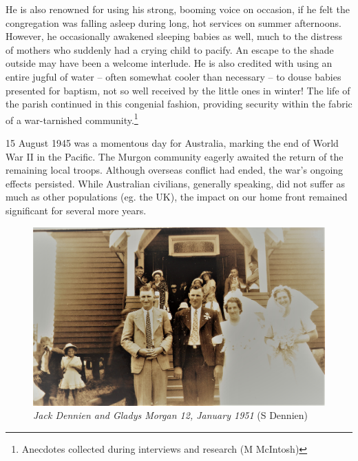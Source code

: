 He is also renowned for using his strong, booming voice on occasion, if he felt the congregation was falling asleep during long, hot services on summer afternoons. However, he occasionally awakened sleeping babies as well, much to the distress of mothers who suddenly had a crying child to pacify. An escape to the shade outside may have been a welcome interlude. He is also credited with using an entire jugful of water -- often somewhat cooler than necessary -- to douse babies presented for baptism, not so well received by the little ones in winter! The life of the parish continued in this congenial fashion, providing security within the fabric of a war-tarnished community.\footnote{Anecdotes collected during interviews and research (M McIntosh)}


15 August 1945 was a momentous day for Australia, marking the end of World War II in the Pacific. The Murgon community eagerly awaited the return of the remaining local troops. Although overseas conflict had ended, the war's ongoing effects persisted. While Australian civilians, generally speaking, did not suffer as much as other populations (eg. the UK), the impact on our home front remained significant for several more years.









\begin{figure}[!htb]
\begin{center}
\includegraphics[width=1.\textwidth,center]{../images/JackDennienGladysMorgan12Jan1951.jpg}
\caption{{\itshape Jack Dennien and Gladys Morgan 12, January 1951} {\scriptsize(S Dennien)}}
\end{center}
\end{figure}




